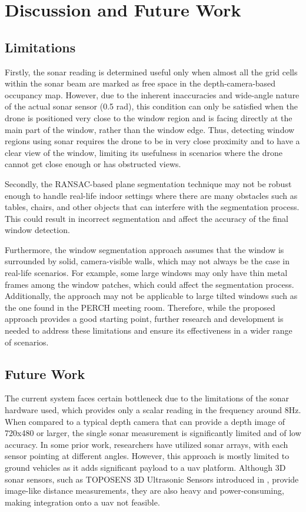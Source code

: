 \section{Discussion and Future Work}
\label{sec:discussion}

\subsection{Limitations}
Firstly, the sonar reading is determined useful only when almost all the grid cells within the sonar beam are marked as free space in the depth-camera-based occupancy map. However, due to the inherent inaccuracies and wide-angle nature of the actual sonar sensor (0.5 rad), this condition can only be satisfied when the drone is positioned very close to the window region and is facing directly at the main part of the window, rather than the window edge. Thus, detecting window regions using sonar requires the drone to be in very close proximity and to have a clear view of the window, limiting its usefulness in scenarios where the drone cannot get close enough or has obstructed views.

Secondly, the RANSAC-based plane segmentation technique may not be robust enough to handle real-life indoor settings where there are many obstacles such as tables, chairs, and other objects that can interfere with the segmentation process. This could result in incorrect segmentation and affect the accuracy of the final window detection.

Furthermore, the window segmentation approach assumes that the window is surrounded by solid, camera-visible walls, which may not always be the case in real-life scenarios. For example, some large windows may only have thin metal frames among the window patches, which could affect the segmentation process. Additionally, the approach may not be applicable to large tilted windows such as the one found in the PERCH meeting room. Therefore, while the proposed approach provides a good starting point, further research and development is needed to address these limitations and ensure its effectiveness in a wider range of scenarios.

\subsection{Future Work}
The current system faces certain bottleneck due to the limitations of the sonar hardware used, which provides only a scalar reading in the frequency around 8Hz. When compared to a typical depth camera that can provide a depth image of 720x480 or larger, the single sonar measurement is significantly limited and of low accuracy. In some prior work, researchers have utilized sonar arrays, with each sensor pointing at different angles. However, this approach is mostly limited to ground vehicles as it adds significant payload to a \gls{uav} platform. Although 3D sonar sensors, such as TOPOSENS 3D Ultrasonic Sensors introduced in \cite{Toposens2020}, provide image-like distance measurements, they are also heavy and power-consuming, making integration onto a \gls{uav} not feasible.


